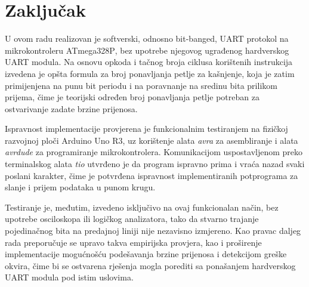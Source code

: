 %
%
{}
\chapter*{Zaključak}
\label{chap:conc}
%
U ovom radu realizovan je softverski, odnosno
\foreignlanguage{english}{bit-banged}, \foreignlanguage{english}{UART}
protokol na mikrokontroleru \foreignlanguage{english}{ATmega328P}, bez
upotrebe njegovog ugrađenog hardverskog \foreignlanguage{english}{UART}
modula. Na osnovu opkoda i tačnog broja ciklusa korištenih instrukcija
izvedena je opšta formula za broj ponavljanja petlje za kašnjenje, koja
je zatim primijenjena na punu bit periodu i na poravnanje na sredinu
bita prilikom prijema, čime je teorijski određen broj ponavljanja
petlje potreban za ostvarivanje zadate brzine prijenosa.

Ispravnost implementacije provjerena je funkcionalnim testiranjem na
fizičkoj razvojnoj ploči Arduino Uno R3, uz korištenje alata \emph{avra}
za asembliranje i alata \emph{avrdude} za programiranje mikrokontrolera.
Komunikacijom uspostavljenom preko terminalskog alata \emph{tio}
utvrđeno je da program ispravno prima i vraća nazad svaki poslani
karakter, čime je potvrđena ispravnost implementiranih potprograma za
slanje i prijem podataka u punom krugu.

Testiranje je, međutim, izvedeno isključivo na ovaj funkcionalan način,
bez upotrebe osciloskopa ili logičkog analizatora, tako da stvarno
trajanje pojedinačnog bita na predajnoj liniji nije nezavisno izmjereno.
Kao pravac daljeg rada preporučuje se upravo takva empirijska provjera,
kao i proširenje implementacije mogućnošću podešavanja brzine prijenosa
i detekcijom greške okvira, čime bi se ostvarena rješenja mogla porediti
sa ponašanjem hardverskog \foreignlanguage{english}{UART} modula pod
istim uslovima.
\newpage
